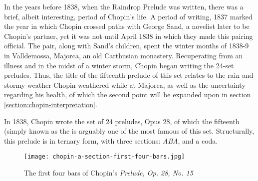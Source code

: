 In the years before 1838, when the Raindrop Prelude was written, there was a brief, albeit interesting, period of Chopin's life. A period of writing, 1837 marked the year in which Chopin crossed paths with George Sand, a novelist later to be Chopin's partner, yet it was not until April 1838 in which they made this pairing official. The pair, along with Sand's children, spent the winter months of 1838-9 in Valldemossa, Majorca, an old Carthusian monastery. Recuperating from an illness and in the midst of a winter storm, Chopin began writing the 24-set preludes\autocite{Samson_2001}. Thus, the title of the fifteenth prelude of this set relates to the rain and stormy weather Chopin weathered while at Majorca, as well as the uncertainty regarding his health, of which the second point will be expanded upon in section \ref{section:chopin-interpretation}.

In 1838, Chopin wrote the set of 24 preludes, Opus 28, of which the fifteenth (simply known as the  is arguably one of the most famous of this set. Structurally, this prelude is in ternary form, with three sections: \textit{ABA}, and a coda. 

\begin{figure}[h]
  \centering
  \texttt{[image: chopin-a-section-first-four-bars.jpg]}
  \caption{The first four bars of Chopin's \textit{Prelude, Op. 28, No. 15}}
  \label{fig:chopin-a-section-first-four-bars}
\end{figure}

